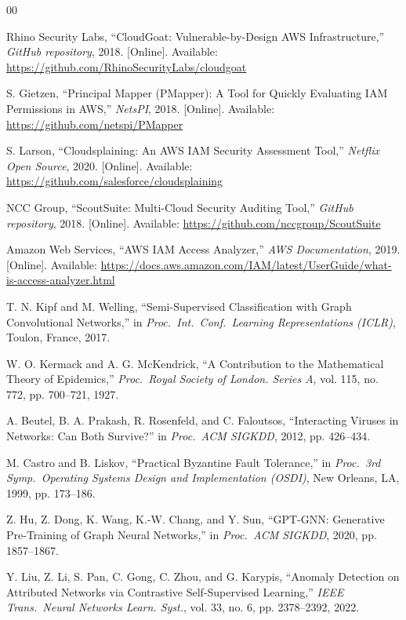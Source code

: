\documentclass[conference,a4paper]{IEEEtran}
\begin{document}
\balance
\begin{thebibliography}{00}

Rhino Security Labs, ``CloudGoat: Vulnerable-by-Design AWS Infrastructure,''
\textit{GitHub repository}, 2018.
[Online]. Available: \url{https://github.com/RhinoSecurityLabs/cloudgoat}

S. Gietzen, ``Principal Mapper (PMapper): A Tool for Quickly
Evaluating IAM Permissions in AWS,''
\textit{NetsPI}, 2018.
[Online]. Available: \url{https://github.com/netspi/PMapper}

S. Larson, ``Cloudsplaining: An AWS IAM Security Assessment Tool,''
\textit{Netflix Open Source}, 2020.
[Online]. Available: \url{https://github.com/salesforce/cloudsplaining}

NCC Group, ``ScoutSuite: Multi-Cloud Security Auditing Tool,''
\textit{GitHub repository}, 2018.
[Online]. Available: \url{https://github.com/nccgroup/ScoutSuite}

Amazon Web Services, ``AWS IAM Access Analyzer,''
\textit{AWS Documentation}, 2019.
[Online]. Available: \url{https://docs.aws.amazon.com/IAM/latest/UserGuide/what-is-access-analyzer.html}

T. N. Kipf and M. Welling,
``Semi-Supervised Classification with Graph Convolutional Networks,''
in \textit{Proc.\ Int.\ Conf.\ Learning Representations (ICLR)},
Toulon, France, 2017.

W. O. Kermack and A. G. McKendrick,
``A Contribution to the Mathematical Theory of Epidemics,''
\textit{Proc.\ Royal Society of London. Series A}, vol. 115,
no. 772, pp. 700--721, 1927.

A. Beutel, B. A. Prakash, R. Rosenfeld, and C. Faloutsos,
``Interacting Viruses in Networks: Can Both Survive?''
in \textit{Proc.\ ACM SIGKDD}, 2012, pp. 426--434.

M. Castro and B. Liskov,
``Practical Byzantine Fault Tolerance,''
in \textit{Proc.\ 3rd Symp.\ Operating Systems Design and Implementation
(OSDI)}, New Orleans, LA, 1999, pp. 173--186.

Z. Hu, Z. Dong, K. Wang, K.-W. Chang, and Y. Sun,
``GPT-GNN: Generative Pre-Training of Graph Neural Networks,''
in \textit{Proc.\ ACM SIGKDD}, 2020, pp. 1857--1867.

Y. Liu, Z. Li, S. Pan, C. Gong, C. Zhou, and G. Karypis,
``Anomaly Detection on Attributed Networks via Contrastive
Self-Supervised Learning,''
\textit{IEEE Trans.\ Neural Networks Learn. Syst.},
vol. 33, no. 6, pp. 2378--2392, 2022.


\end{thebibliography}
\end{document}
